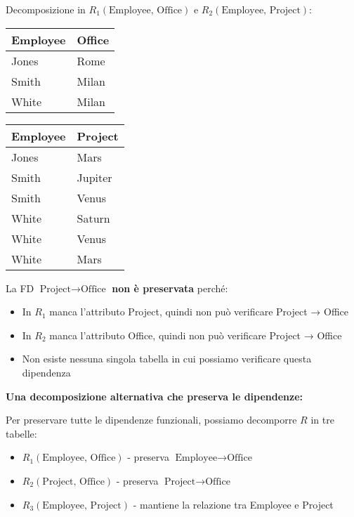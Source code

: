 \documentclass{article}
\begin{document}
	\noindent Decomposizione in $R_1(\text{Employee, Office})$ e $R_2(\text{Employee, Project})$:
	\begin{center}
	\begin{tabular}{|l|l|}
		\hline
		\textbf{Employee} & \textbf{Office} \\ \hline
		Jones & Rome \\ \hline
		Smith & Milan \\ \hline
		White & Milan \\ \hline
	\end{tabular}
	\quad
	\begin{tabular}{|l|l|}
		\hline
		\textbf{Employee} & \textbf{Project} \\ \hline
		Jones & Mars \\ \hline
		Smith & Jupiter \\ \hline
		Smith & Venus \\ \hline
		White & Saturn \\ \hline
		White & Venus \\ \hline
		White & Mars \\ \hline
	\end{tabular}
	\end{center}

	\noindent La FD $\text{Project} \rightarrow \text{Office}$ \textbf{non è preservata} perché:
	\begin{itemize}
		\item In $R_1$ manca l'attributo Project, quindi non può verificare Project → Office
		\item In $R_2$ manca l'attributo Office, quindi non può verificare Project → Office
		\item Non esiste nessuna singola tabella in cui possiamo verificare questa dipendenza
	\end{itemize}
	
	\noindent \textbf{Una decomposizione alternativa che preserva le dipendenze:}
	
	Per preservare tutte le dipendenze funzionali, possiamo decomporre $R$ in tre tabelle:
	\begin{itemize}
		\item $R_1(\text{Employee, Office})$ - preserva $\text{Employee} \rightarrow \text{Office}$
		\item $R_2(\text{Project, Office})$ - preserva $\text{Project} \rightarrow \text{Office}$
		\item $R_3(\text{Employee, Project})$ - mantiene la relazione tra Employee e Project
	\end{itemize}
\end{document}
